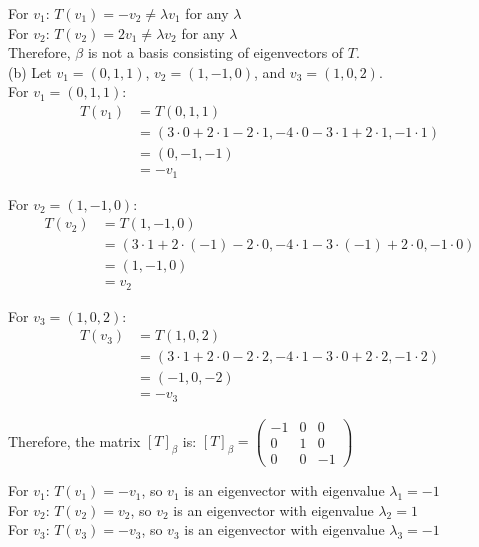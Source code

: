 \documentclass{article}
\begin{document}
For $v_1$: $T(v_1) = -v_2 \neq \lambda v_1$ for any $\lambda$ \\

For $v_2$: $T(v_2) = 2v_1 \neq \lambda v_2$ for any $\lambda$ \\

Therefore, $\beta$ is not a basis consisting of eigenvectors of $T$. \\

(b) Let $v_1 = (0,1,1)$, $v_2 = (1,-1,0)$, and $v_3 = (1,0,2)$. \\

For $v_1 = (0,1,1)$:
\begin{align*}
    T(v_1) &= T(0,1,1) \\
    &= (3 \cdot 0 + 2 \cdot 1 - 2 \cdot 1, -4 \cdot 0 - 3 \cdot 1 + 2 \cdot 1, -1 \cdot 1) \\
    &= (0, -1, -1) \\
    &= -v_1
\end{align*}

For $v_2 = (1,-1,0)$:
\begin{align*}
    T(v_2) &= T(1,-1,0) \\
    &= (3 \cdot 1 + 2 \cdot (-1) - 2 \cdot 0, -4 \cdot 1 - 3 \cdot (-1) + 2 \cdot 0, -1 \cdot 0) \\
    &= (1, -1, 0) \\
    &= v_2
\end{align*}

For $v_3 = (1,0,2)$:
\begin{align*}
    T(v_3) &= T(1,0,2) \\
    &= (3 \cdot 1 + 2 \cdot 0 - 2 \cdot 2, -4 \cdot 1 - 3 \cdot 0 + 2 \cdot 2, -1 \cdot 2) \\
    &= (-1, 0, -2) \\
    &= -v_3
\end{align*}

Therefore, the matrix $[T]_\beta$ is:
$[T]_\beta = \begin{pmatrix} -1 & 0 & 0 \\ 0 & 1 & 0 \\ 0 & 0 & -1 \end{pmatrix}$

For $v_1$: $T(v_1) = -v_1$, so $v_1$ is an eigenvector with eigenvalue $\lambda_1 = -1$ \\

For $v_2$: $T(v_2) = v_2$, so $v_2$ is an eigenvector with eigenvalue $\lambda_2 = 1$ \\

For $v_3$: $T(v_3) = -v_3$, so $v_3$ is an eigenvector with eigenvalue $\lambda_3 = -1$ \\
\end{document}
